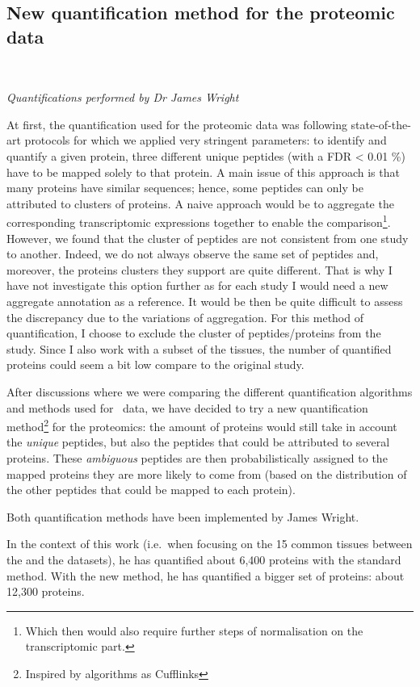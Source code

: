 \subsection{New quantification method for the proteomic data}
\label{subsec:IntegrationNewMethQuant}\raggedbottom\

\textit{Quantifications performed by Dr James Wright}

At first, the quantification used for the proteomic data was following
state-of-the-art protocols for which we applied very stringent parameters:
to identify and quantify a given protein, three different unique peptides
(with a \gls{FDR} < 0.01 \%) have to be mapped solely to that protein. A main issue of
this approach is that many proteins have similar sequences; hence, some peptides
can only be attributed to clusters of proteins. A naive approach would be to
aggregate the corresponding transcriptomic expressions together to enable the
comparison\footnote{Which then would also require further steps of normalisation
on the transcriptomic part.}. However, we found that the cluster of peptides
are not consistent from one study to another. Indeed, we do not always observe the
same set of peptides and, moreover, the proteins clusters they support are quite different.
That is why I have not investigate this option further as for each study I
would need a new aggregate annotation as a reference. It would be then be quite
difficult to assess the discrepancy due to the variations of aggregation.
For this method of quantification, I choose to exclude the cluster of
peptides/proteins from the study. Since I also work with a subset of the tissues,
the number of quantified proteins could seem a bit low compare to the original study.

After discussions where we were comparing the different quantification algorithms
and methods used for \Rnaseq\ data, we have decided to try a new quantification
method\footnote{Inspired by algorithms as Cufflinks} for the proteomics:
the amount of proteins would still take in account the \emph{unique} peptides,
but also the peptides that could be attributed to several proteins.
These \emph{ambiguous} peptides are then probabilistically assigned to the
mapped proteins they are more likely to come from (based on the distribution of
the other peptides that could be mapped to each protein).

Both quantification methods have been implemented by James Wright.

In the context of this work (i.e.\ when focusing on the 15 common tissues between
the  and the  datasets),
he has quantified about 6,400 proteins with
the standard method. With the new method, he has quantified a bigger set of
proteins: about 12,300 proteins.

